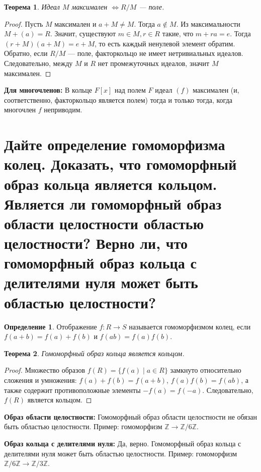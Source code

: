 \documentclass[12pt, a4paper]{article}
\theoremstyle{definition}
\newtheorem{definition}{Определение}[section]
\theoremstyle{plain}
\newtheorem{theorem}{Теорема}[section]
\begin{document}
	\begin{theorem}
		Идеал $M$ максимален $\iff R/M$ — поле.
	\end{theorem}
	\begin{proof}
		Пусть $M$ максимален и $a+M \neq M$. Тогда $a \notin M$. Из максимальности $M+(a)=R$. Значит, существуют $m \in M, r \in R$ такие, что $m+ra=e$. Тогда $(r+M)(a+M) = e+M$, то есть каждый ненулевой элемент обратим. Обратно, если $R/M$ — поле, факторкольцо не имеет нетривиальных идеалов. Следовательно, между $M$ и $R$ нет промежуточных идеалов, значит $M$ максимален.
	\end{proof}
	
	\textbf{Для многочленов:} В кольце $F[x]$ над полем $F$ идеал $(f)$ максимален (и, соответственно, факторкольцо является полем) тогда и только тогда, когда многочлен $f$ неприводим.
	
	\newpage
	\section{Дайте определение гомоморфизма колец. Доказать, что гомоморфный образ кольца является кольцом. Является ли гомоморфный образ области целостности областью целостности? Верно ли, что гомоморфный образ кольца с делителями нуля может быть областью целостности?}
	
	\begin{definition}
		Отображение $f: R \to S$ называется гомоморфизмом колец, если $f(a+b)=f(a)+f(b)$ и $f(ab)=f(a)f(b)$.
	\end{definition}
	
	\begin{theorem}
		Гомоморфный образ кольца является кольцом.
	\end{theorem}
	\begin{proof}
		Множество образов $f(R) = \{f(a) \mid a \in R\}$ замкнуто относительно сложения и умножения: $f(a)+f(b)=f(a+b)$, $f(a)f(b)=f(ab)$, а также содержит противоположные элементы $-f(a)=f(-a)$. Следовательно, $f(R)$ является кольцом.
	\end{proof}
	
	\textbf{Образ области целостности:} Гомоморфный образ области целостности не обязан быть областью целостности. Пример: гомоморфизм $\mathbb{Z} \to \mathbb{Z}/6\mathbb{Z}$.
	
	\textbf{Образ кольца с делителями нуля:} Да, верно. Гомоморфный образ кольца с делителями нуля может быть областью целостности. Пример: гомоморфизм $\mathbb{Z}/6\mathbb{Z} \to \mathbb{Z}/3\mathbb{Z}$.
	
\end{document}
